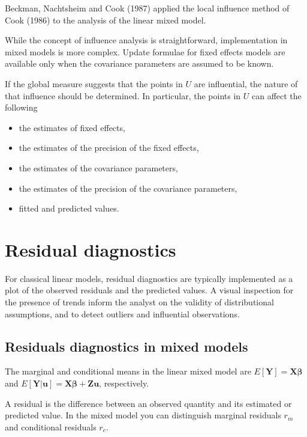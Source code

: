 \documentclass[Main.tex]{subfiles}
\begin{document}
Beckman, Nachtsheim and Cook (1987) \citet{Beckman} applied the local influence method of Cook (1986) to the analysis of the linear mixed model.

While the concept of influence analysis is straightforward, implementation in mixed models is more complex. Update formulae for fixed effects models are available only when the covariance parameters are assumed to be known.

If the global measure suggests that the points in $U$ are influential, the nature of that influence should be determined. In particular, the points in $U$ can affect the following

\begin{itemize}
	\item the estimates of fixed effects,
	\item the estimates of the precision of the fixed effects,
	\item the estimates of the covariance parameters,
	\item the estimates of the precision of the covariance parameters,
	\item fitted and predicted values.
\end{itemize}


\newpage
\section{Residual diagnostics} %
For classical linear models, residual diagnostics are typically implemented as a plot of the observed residuals and the predicted values. A visual inspection for the presence of trends inform the analyst on the validity of distributional assumptions, and to detect outliers and influential observations.




\subsection{Residuals diagnostics in mixed models}

The marginal and conditional means in the linear mixed model are
$E[\boldsymbol{Y}] = \boldsymbol{X}\boldsymbol{\beta}$ and
$E[\boldsymbol{Y|\boldsymbol{u}}] = \boldsymbol{X}\boldsymbol{\beta} + \boldsymbol{Z}\boldsymbol{u}$, respectively.

A residual is the difference between an observed quantity and its estimated or predicted value. In the mixed
model you can distinguish marginal residuals $r_m$ and conditional residuals $r_c$. 
\end{document}

